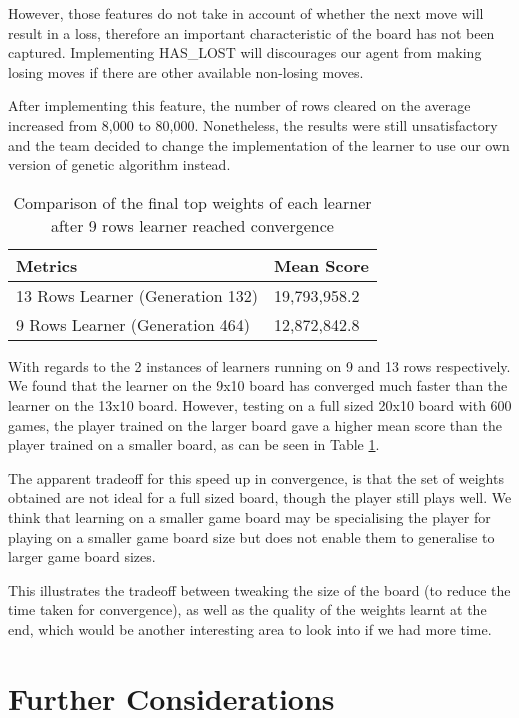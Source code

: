 \documentclass[a4paper,12pt,twocolumn]{article}
\begin{document}
However, those features do not take in account of whether the next move will result
in a loss, therefore an important characteristic of the board has not been captured.
Implementing HAS\_LOST will discourages our agent from making losing moves if
there are other available non-losing moves.

After implementing this feature, the number of rows cleared on the average increased
from 8,000 to 80,000. Nonetheless, the results were still unsatisfactory and the team
decided to change the implementation of the learner to use our own version of genetic
algorithm instead.

\begin{table}[h]
	\centering
	\begin{tabular}{|l|l|}
		\hline
		\textbf{Metrics}                 & \textbf{Mean Score} \\
		\hline
		13 Rows Learner (Generation 132) & 19,793,958.2        \\
		\hline
		9 Rows Learner (Generation 464)  & 12,872,842.8        \\
		\hline
	\end{tabular}
	\caption{
		Comparison of the final top weights of each learner after 9 rows learner
		reached convergence
	}
	\label{learner_comparison}
\end{table}

With regards to the 2 instances of learners running on 9 and 13 rows respectively.
We found that the learner on the 9x10 board has converged much faster than the
learner on the 13x10 board. However, testing on a full sized 20x10 board with 600 games,
the player trained on the larger board gave a higher mean score than the player
trained on a smaller board, as can be seen in Table \ref{learner_comparison}.

The apparent tradeoff for this speed up in convergence, is that the set of weights
obtained are not ideal for a full sized board, though the player still plays well.
We think that learning on a smaller game board may be specialising the player for playing on
a smaller game board size but does not enable them to generalise to larger game board sizes.

This illustrates the tradeoff between tweaking the size of the board (to
reduce the time taken for convergence), as well as the quality of the weights
learnt at the end, which would be another interesting area to look into if we had
more time.

\section{Further Considerations}
\end{document}
